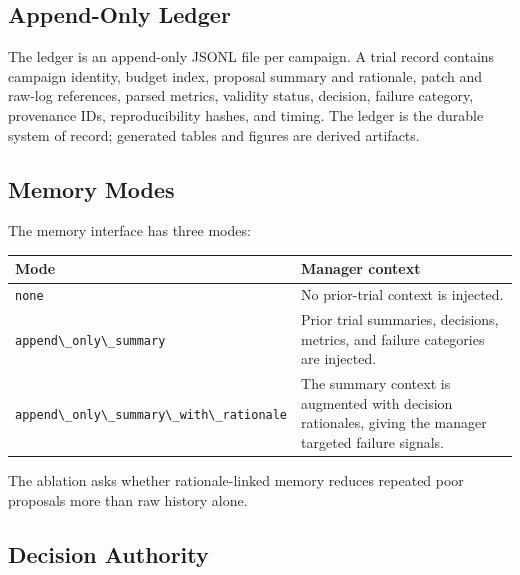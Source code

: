 \subsection{Append-Only Ledger}\label{append-only-ledger}

The ledger is an append-only JSONL file per campaign. A trial record contains campaign identity, budget index, proposal summary and rationale, patch and raw-log references, parsed metrics, validity status, decision, failure category, provenance IDs, reproducibility hashes, and timing. The ledger is the durable system of record; generated tables and figures are derived artifacts.

\subsection{Memory Modes}\label{memory-modes}

The memory interface has three modes:

\begin{table}[t]
\small
\begin{tabular}{@{}
  >{\raggedright\arraybackslash}p{}
  >{\raggedright\arraybackslash}p{}@{}}
\toprule
\begin{minipage}[b]{\linewidth}\raggedright
Mode
\end{minipage} & \begin{minipage}[b]{\linewidth}\raggedright
Manager context
\end{minipage} \\
\midrule
\bottomrule
\passthrough{\lstinline!none!} & No prior-trial context is injected. \\
\passthrough{\lstinline!append\_only\_summary!} & Prior trial summaries, decisions, metrics, and failure categories are injected. \\
\passthrough{\lstinline!append\_only\_summary\_with\_rationale!} & The summary context is augmented with decision rationales, giving the manager targeted failure signals. \\
\end{tabular}
\end{table}

The ablation asks whether rationale-linked memory reduces repeated poor proposals more than raw history alone.

\subsection{Decision Authority}\label{decision-authority}

